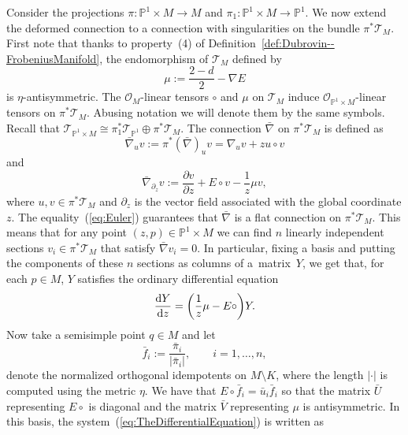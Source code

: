 \documentclass[10pt,a4paper]{amsart}
\numberwithin{equation}{section}
\begin{document}
Consider the projections $\pi\colon\mathbb{P}^{1}\times M\rightarrow M$ and $\pi_{1}\colon\mathbb{P}^{1}\times M\rightarrow\mathbb{P}^{1}$. We now extend the deformed connection to a connection with singularities on the bundle $\pi^{*}\mathcal{T}_{M}$. First note that thanks to property~(4) of Definition~\ref{def:Dubrovin--FrobeniusManifold}, the endomorphism of $\mathcal{T}_{M}$ defined by
\begin{equation*}
 \mu:=\frac{2-d}{2}-\nabla E
\end{equation*}
is $\eta$-antisymmetric. The $\mathcal{O}_{M}$-linear tensors $\circ$ and $\mu$ on $\mathcal{T}_{M}$ induce $\mathcal{O}_{\mathbb{P}^{1}\times M}$-linear tensors on $\pi^{*}\mathcal{T}_{M}$. Abusing notation we will denote them by the same symbols. Recall that $\mathcal{T}_{\mathbb{P}^{1}\times M}\cong \pi^{*}_{1}\mathcal{T}_{\mathbb{P}^{1}}\oplus \pi^{*}\mathcal{T}_{M}$. The connection $\bar{\nabla}$ on $\pi^{*}\mathcal{T}_{M}$ is defined as
\begin{equation*}
 \bar{\nabla}_{u}v:=\pi^{*}\left(\bar{\nabla}\right)_{u}v =\nabla_{u}v+zu\circ v
 \end{equation*}
 and
 \begin{equation*}
 \bar{\nabla}_{\partial_{z}}v:=\frac{\partial v}{\partial z}+E\circ v-\frac{1}{z}\mu v,
 \end{equation*}
where $u,v\in\pi^{*}\mathcal{T}_{ M}$ and $\partial_{z}$ is the vector field associated with the global coordinate $z$. The equality~(\ref{eq:Euler}) guarantees that $\bar{\nabla}$ is a flat connection on $\pi^{*}\mathcal{T}_{M}$. This means that for any point $(z,p)\in\mathbb{P}^{1}\times M$ we can find $n$ linearly independent sections $v_{i}\in\pi^{*}\mathcal{T}_{M}$ that satisfy $\bar{\nabla}v_{i}=0$. In particular, fixing a basis and putting the components of these $n$ sections as columns of a~matrix~$Y$, we get that, for each $p\in M$, $Y$ satisfies the ordinary differential equation
\begin{equation}
 \label{eq:TheDifferentialEquation}
 \frac{{\rm d}Y}{{\rm d}z}=\biggl(\frac{1}{z}\mu - E\circ \biggr)Y.
 \end{equation}
 Now take a semisimple point $q\in M$ and let
 \begin{equation*}
 \bar{f}_{i}:=\frac{\bar{\pi}_{i}}{|\bar{\pi}_{i}|}, \qquad i=1,\dots,n,
 \end{equation*}
 denote the normalized orthogonal idempotents on $M\setminus K$, where the length $|\cdot|$ is computed using the metric $\eta$. We have that $E\circ \bar{f}_{i}=\bar{u}_{i}\bar{f}_{i}$ so that the matrix $\bar{U}$ representing $E\circ$ is diagonal and the matrix $\bar{V}$ representing $\mu$ is antisymmetric. In this basis, the system~(\ref{eq:TheDifferentialEquation}) is written as
\end{document}
